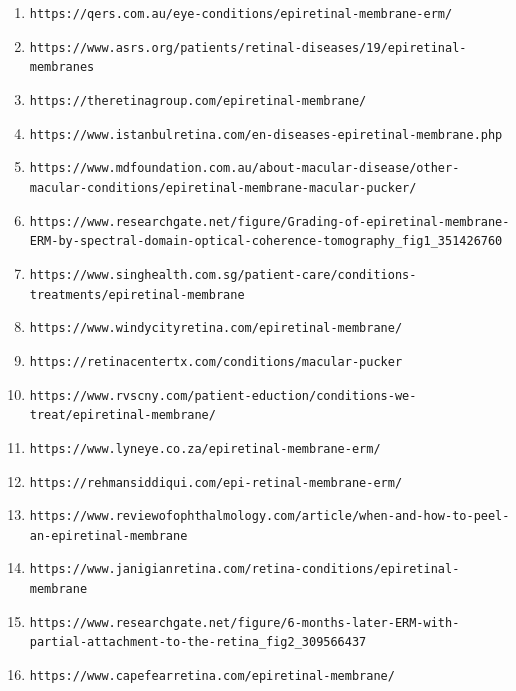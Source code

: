 \documentclass{article}
\begin{document}
	\begin{enumerate}
		\item \nolinkurl{https://qers.com.au/eye-conditions/epiretinal-membrane-erm/}
		
		\item \nolinkurl{https://www.asrs.org/patients/retinal-diseases/19/epiretinal-membranes}
		
		\item \nolinkurl{https://theretinagroup.com/epiretinal-membrane/}
		
		\item \nolinkurl{https://www.istanbulretina.com/en-diseases-epiretinal-membrane.php}
		
		\item \nolinkurl{https://www.mdfoundation.com.au/about-macular-disease/other-macular-conditions/epiretinal-membrane-macular-pucker/}
		
		\item \nolinkurl{https://www.researchgate.net/figure/Grading-of-epiretinal-membrane-ERM-by-spectral-domain-optical-coherence-tomography_fig1_351426760}
		
		\item \nolinkurl{https://www.singhealth.com.sg/patient-care/conditions-treatments/epiretinal-membrane}
		
		\item \nolinkurl{https://www.windycityretina.com/epiretinal-membrane/}
		
		\item \nolinkurl{https://retinacentertx.com/conditions/macular-pucker}
		
		\item \nolinkurl{https://www.rvscny.com/patient-eduction/conditions-we-treat/epiretinal-membrane/}
		
		\item \nolinkurl{https://www.lyneye.co.za/epiretinal-membrane-erm/}
		
		\item \nolinkurl{https://rehmansiddiqui.com/epi-retinal-membrane-erm/}
		
		\item \nolinkurl{https://www.reviewofophthalmology.com/article/when-and-how-to-peel-an-epiretinal-membrane}
		
		\item \nolinkurl{https://www.janigianretina.com/retina-conditions/epiretinal-membrane}
		
		\item \nolinkurl{https://www.researchgate.net/figure/6-months-later-ERM-with-partial-attachment-to-the-retina_fig2_309566437}
		
		\item \nolinkurl{https://www.capefearretina.com/epiretinal-membrane/}
	\end{enumerate}
	
\end{document}
